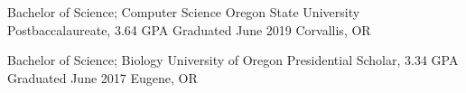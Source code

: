 \showoff
{Bachelor of Science; Computer Science}
{Oregon State University Postbaccalaureate, 3.64 GPA}
{Graduated June 2019}
{Corvallis, OR}

\myBreak

\showoff
{Bachelor of Science; Biology}
{University of Oregon Presidential Scholar, 3.34 GPA}
{Graduated June 2017}
{Eugene, OR}

\medbreak
